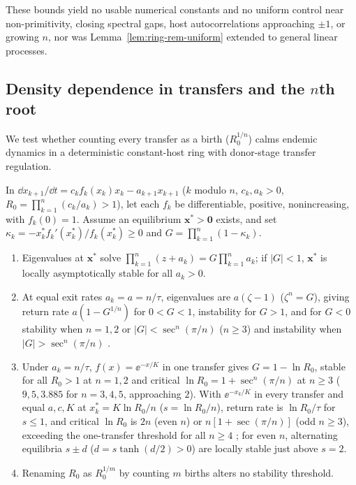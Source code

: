 These bounds yield no usable numerical constants and no uniform control near non-primitivity, closing spectral gaps, host autocorrelations approaching $\pm1$, or growing $n$, nor was Lemma~\ref{lem:ring-rem-uniform} extended to general linear processes.

\subsection{Density dependence in transfers and the \texorpdfstring{$n$}{n}th root}\label{subsec:ring-density}

We test whether counting every transfer as a birth ($R_0^{1/n}$) calms endemic dynamics \citep{dobson2020} in a deterministic constant-host ring with donor-stage transfer regulation.

\begin{proposition}\label{prop:ring-reg}
In $\dd x_{k+1}/\dd t = c_k f_k(x_k) x_k - a_{k+1} x_{k+1}$ ($k$ modulo $n$, $c_k, a_k > 0$, $R_0 = \prod_{k=1}^n (c_k / a_k) > 1$), let each $f_k$ be differentiable, positive, nonincreasing, with $f_k(0) = 1$. Assume an equilibrium $\mathbf{x}^* > \mathbf{0}$ exists, and set $\kappa_k = -x_k^* f_k'(x_k^*)/f_k(x_k^*) \ge 0$ and $G = \prod_{k=1}^n (1 - \kappa_k)$.
\begin{enumerate}
\item[(a)] Eigenvalues at $\mathbf{x}^*$ solve $\prod_{k=1}^n (z + a_k) = G\prod_{k=1}^n a_k$; if $|G| < 1$, $\mathbf{x}^*$ is locally asymptotically stable for all $a_k > 0$.
\item[(b)] At equal exit rates $a_k = a = n/\tau$, eigenvalues are $a(\zeta - 1)$ ($\zeta^n = G$), giving return rate $a(1 - G^{1/n})$ for $0 < G < 1$, instability for $G > 1$, and for $G < 0$ stability when $n = 1, 2$ or $|G| < \sec^n(\pi/n)$ ($n \ge 3$) and instability when $|G| > \sec^n(\pi/n)$ \citep{tyson1978,thron1991,arcak2006}.
\item[(c)] Under $a_k = n/\tau$, $f(x) = \ee^{-x/K}$ in one transfer gives $G = 1 - \ln R_0$, stable for all $R_0 > 1$ at $n = 1, 2$ and critical $\ln R_0 = 1 + \sec^n(\pi/n)$ at $n \ge 3$ ($9, 5, 3.885$ for $n = 3, 4, 5$, approaching $2$). With $\ee^{-x_k/K}$ in every transfer and equal $a, c, K$ at $x_k^* = K\ln R_0 / n$ ($s = \ln R_0 / n$), return rate is $\ln R_0 / \tau$ for $s \le 1$, and critical $\ln R_0$ is $2n$ (even $n$) or $n[1 + \sec(\pi/n)]$ (odd $n \ge 3$), exceeding the one-transfer threshold for all $n \ge 4$ \citep{smith1987,muller2006,strelkowa2010}; for even $n$, alternating equilibria $s \pm d$ ($d = s\tanh(d/2) > 0$) are locally stable just above $s = 2$.
\item[(d)] Renaming $R_0$ as $R_0^{1/m}$ by counting $m$ births alters no stability threshold.
\end{enumerate}
\end{proposition}

